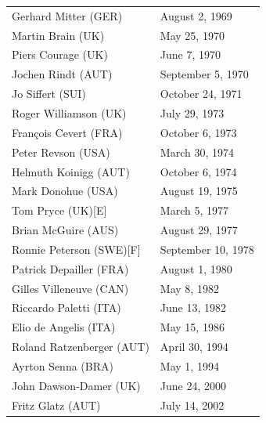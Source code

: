 \documentclass[12pt]{article} %
\begin{document}
\begin{center}
\begin{longtable}{p{8cm} p{4cm}}
 Gerhard Mitter (GER)&August 2, 1969\\
 Martin Brain (UK)&May 25, 1970\\
 Piers Courage (UK)&June 7, 1970\\
 Jochen Rindt (AUT)&September 5, 1970\\
 Jo Siffert (SUI)&October 24, 1971\\
 Roger Williamson (UK)&July 29, 1973\\
 François Cevert (FRA)&October 6, 1973\\
 Peter Revson (USA)&March 30, 1974\\
 Helmuth Koinigg (AUT)&October 6, 1974\\
 Mark Donohue (USA)&August 19, 1975\\
 Tom Pryce (UK)[E]&March 5, 1977\\
 Brian McGuire (AUS)&August 29, 1977\\
 Ronnie Peterson (SWE)[F]&September 10, 1978\\
 Patrick Depailler (FRA)&August 1, 1980\\
 Gilles Villeneuve (CAN)&May 8, 1982\\
 Riccardo Paletti (ITA)&June 13, 1982\\
 Elio de Angelis (ITA)&May 15, 1986\\
 Roland Ratzenberger (AUT)&April 30, 1994\\
 Ayrton Senna (BRA)&May 1, 1994\\
 John Dawson-Damer (UK)&June 24, 2000\\
 Fritz Glatz (AUT)&July 14, 2002\\
\end{longtable}
\end{center}

\end{document}
